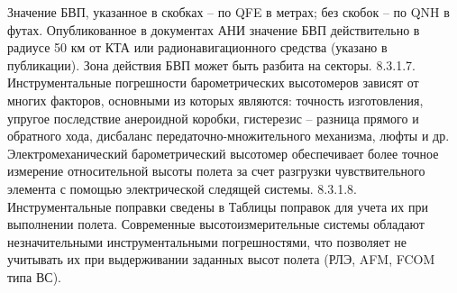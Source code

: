 Значение БВП, указанное в скобках – по QFE в метрах; без скобок – по QNH в футах. 
Опубликованное в документах АНИ значение БВП действительно в радиусе 50 км от КТА или радионавигационного средства (указано в публикации). 
Зона действия БВП может быть разбита на секторы.
8.3.1.7. Инструментальные погрешности барометрических высотомеров зависят от многих факторов, основными из которых являются: точность изготовления, упругое последствие анероидной коробки, гистерезис – разница прямого и обратного хода, дисбаланс передаточно-множительного механизма, люфты и др.
Электромеханический барометрический высотомер обеспечивает более точное измерение относительной высоты полета за счет разгрузки чувствительного элемента с помощью электрической следящей системы. 
8.3.1.8. Инструментальные поправки сведены в Таблицы поправок для учета их при выполнении полета. 
Современные высотоизмерительные системы обладают незначительными инструментальными погрешностями, что позволяет не учитывать их при выдерживании заданных высот полета (РЛЭ, AFM, FCOM типа ВС).
